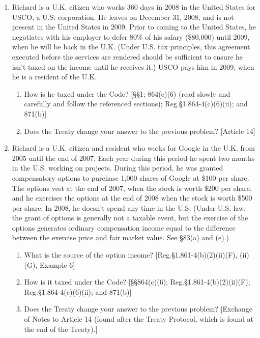 \begin{select}
\begin{enumerate}
		\item Richard is a U.K. citizen who works 360 days in 2008 in the United States for USCO, a U.S. corporation.  He leaves on December 31, 2008, and is not present in the United States in 2009.   Prior to coming to the United States, he negotiates with his employer to defer 80\% of his salary (\$80,000) until 2009, when he will be back in the U.K.  (Under U.S. tax principles, this agreement executed before the services are rendered should be sufficient to ensure he isn't taxed on the income until he receives it.)  USCO pays him in 2009, when he is a resident of the U.K.
				\begin{enumerate}
					\item How is he taxed under the Code?  [\S\S 1; 864(c)(6) (read slowly and carefully and follow the referenced sections); Reg.\@ \S 1.864-4(c)(6)(ii); and 871(b)]
					\item Does the Treaty change your answer to the previous problem? [Article 14]
				\end{enumerate}
				
			\item Richard is a U.K. citizen and resident who works for Google in the U.K. from 2005 until the end of 2007.  Each year during this period he spent two months in the U.S. working on projects.  During this period, he was granted compensatory options to purchase 1,000 shares of Google at \$100 per share.  The options vest at the end of 2007, when the stock is worth \$200 per share, and he exercises the options at the end of 2008 when the stock is worth \$500 per share.  In 2008, he doesn't spend any time in the U.S.  (Under U.S. law, the grant of options is generally not a taxable event, but the exercise of the options generates ordinary compensation income equal to the difference between the exercise price and fair market value.  See \S 83(a) and (e).)  				
			\begin{enumerate}
					\item What is the source of the option income?   [Reg.\@ \S 1.861-4(b)(2)(ii)(F), (ii)(G), Example 6]
					\item How is it taxed under the Code?  [\S\S 864(c)(6); Reg.\@ \S 1.861-4(b)(2)(ii)(F); Reg.\@ \S 1.864-4(c)(6)(ii); and 871(b)]
					\item Does the Treaty change your answer to the previous problem? [Exchange of Notes to Article 14 (found after the Treaty Protocol, which is found at the end of the Treaty).]
				\end{enumerate}


\end{enumerate}
\end{select}
